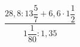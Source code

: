 \begin{ex}[type=calculate]
	\begin{condition}
		 \( \dfrac{28,8:13\dfrac{5}{7}+6,6\cdot1\dfrac{1}{2}}{1\dfrac{1}{80}:1,35} \) 
	\end{condition}
\end{ex}